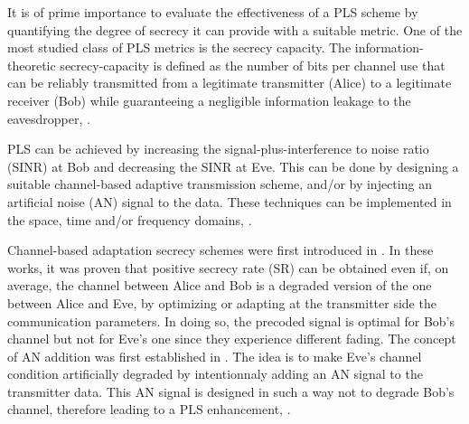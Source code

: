 \documentclass[journal,comsoc]{IEEEtran}
\begin{document}
It is of prime importance to evaluate the effectiveness of a PLS scheme by quantifying the degree of secrecy it can provide with a suitable metric. One of the most studied class of PLS metrics is the secrecy capacity. The information-theoretic secrecy-capacity is defined as the number of bits per channel use that can be reliably transmitted from a legitimate transmitter (Alice) to a legitimate receiver (Bob) while guaranteeing a negligible information leakage to the eavesdropper, \cite{bloch_barros_2011}.

 PLS can be achieved by increasing the signal-plus-interference to noise ratio (SINR) at Bob and decreasing the SINR at Eve. This can be done by designing a suitable channel-based adaptive transmission scheme, and/or by injecting an artificial noise (AN) signal to the data. These techniques can be implemented in the space, time and/or frequency domains, \cite{8509094,7762075,MELKI20191}.

Channel-based adaptation secrecy schemes were first introduced in \cite{4529264,4529282,4626059}. In these works, it was proven that positive secrecy rate (SR) can be obtained even if, on average, the channel between Alice and Bob is a degraded version of the one between Alice and Eve, by optimizing or adapting at the transmitter side the communication parameters. In doing so, the precoded signal is optimal for Bob's channel but not for Eve's one since they experience different fading. The concept of AN addition was first established in \cite{1558439,1605889,4543070}. The idea is to make Eve's channel condition artificially degraded by intentionnaly adding an AN signal to the transmitter data. This AN signal is designed in such a way not to degrade Bob's channel, therefore leading to a PLS enhancement, \cite{8509094}.
\end{document}
